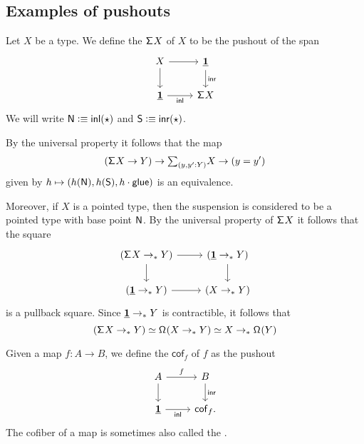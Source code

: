 \subsection{Examples of pushouts}

\begin{defn}
Let $X$ be a type. We define the  $\mathsf{\Sigma}^{} X$ of $X$ to be the pushout of the span
\begin{equation*}
\begin{tikzcd}
X \arrow[r] \arrow[d] & \unit \arrow[d,"\inr"] \\
\unit \arrow[r,swap,"\inl"] & \susp X 
\end{tikzcd}
\end{equation*}
We will write $\mathsf{N}\vcentcolon\equiv{\mathsf{inl}}(\star)$ and $\mathsf{S}\vcentcolon\equiv{\mathsf{inr}}(\star)$. 
\end{defn}

\begin{rmk}By the universal property it follows that the map
\begin{equation*}
(\susp X \to Y) \to \sm{y,y':Y}X\to (y=y')
\end{equation*}
given by $h\mapsto (h(\mathsf{N}),h(\mathsf{S}),h\cdot\mathsf{glue})$ is an equivalence. 

Moreover, if $X$ is a pointed type, then the suspension is considered to be a pointed type with base point $\mathsf{N}$. By the universal property of $\mathsf{\Sigma}^{} X$ it follows that the square
\begin{equation*}
\begin{tikzcd}
(\susp X\to_\ast Y) \arrow[r] \arrow[d] & (\unit \to_\ast Y) \arrow[d] \\
(\unit\to_\ast Y) \arrow[r] & (X\to_\ast Y)
\end{tikzcd}
\end{equation*}
is a pullback square. Since $\underline{\mathbf{1}}\to_\ast Y$ is contractible, it follows that 
\begin{equation*}
(\mathsf{\Sigma}^{} X\to_\ast Y) \simeq \mathsf{\Omega}^{}(X\to_\ast Y) \simeq X \to_\ast \mathsf{\Omega}^{}(Y)
\end{equation*}
\end{rmk}

\begin{defn}
Given a map $f:A\to B$, we define the  $\mathsf{cof}_f$ of $f$ as the pushout
\begin{equation*}
\begin{tikzcd}
A \arrow[r,"f"] \arrow[d] & B \arrow[d,"\inr"] \\
\unit \arrow[r,swap,"\inl"] & \mathsf{cof}_f. 
\end{tikzcd}
\end{equation*}
The cofiber of a map is sometimes also called the .
\end{defn}

